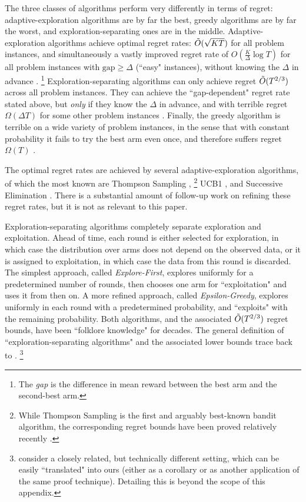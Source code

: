 The three classes of algorithms perform very differently in terms of regret: adaptive-exploration algorithms are by far the best, greedy algorithms are by far the worst, and exploration-separating ones are in the middle. Adaptive-exploration algorithms achieve optimal regret rates:
    $\tilde{O}(\sqrt{KT})$
for all problem instances, and simultaneously a vastly improved regret rate of
    $O(\tfrac{K}{\Delta}\log T)$
for all problem instances with $\text{gap}\geq \Delta$ (``easy" instances), without knowing the $\Delta$ in advance
\citep{Lai-Robbins-85,bandits-ucb1,bandits-exp3}.%
\footnote{The \emph{gap} is the difference in mean reward between the best arm and the second-best arm.}
Exploration-separating algorithms can only achieve regret $\tilde{O}(T^{2/3})$ across all problem instances. They can achieve the ``gap-dependent" regret rate stated above, but \emph{only} if they know the $\Delta$ in advance, and with terrible regret $\Omega(\Delta T)$ for some other problem instances \citep{MechMAB-ec09}. Finally, the greedy algorithm is terrible on a wide variety of problem instances, in the sense that with constant probability it fails to try the best arm even once, and therefore suffers regret $\Omega(T)$
\citep[see Chapter 11.2 in][]{slivkins-MABbook}.


The optimal regret rates are achieved by several adaptive-exploration  algorithms, of which the most known are
Thompson Sampling \citep{Thompson-1933,TS-survey-FTML18},%
\footnote{While Thompson Sampling is the first and arguably best-known bandit algorithm, the corresponding regret bounds have been proved relatively recently \citep{Shipra-colt12,Kaufmann-alt12,Shipra-aistats13}.}
UCB1 \citep{bandits-ucb1},
and Successive Elimination \citep{EvenDar-icml06}. There is a substantial amount of follow-up work on refining these regret rates, but it is not as relevant to this paper.

Exploration-separating algorithms completely separate exploration and exploitation. Ahead of time, each round is either selected for exploration, in which case  the distribution over arms does not depend on the observed data, or it is assigned to exploitation, in which case the data from this round is discarded. The simplest approach, called \emph{Explore-First}, explores uniformly for a predetermined number of rounds, then chooses one arm for ``exploitation" and uses it from then on. A more refined approach, called \emph{Epsilon-Greedy}, explores uniformly in each round with a predetermined probability, and ``exploits" with the remaining probability. Both algorithms, and the associated $\tilde{O}(T^{2/3})$ regret bounds, have been ``folklore knowledge" for decades. The general definition of ``exploration-separating algorithms" and the associated lower bounds trace back to \citet{MechMAB-ec09}.%
\footnote{\citet{MechMAB-ec09} consider a closely related, but technically different setting, which can be easily ``translated" into ours (either as a corollary or as another application of the same proof technique). Detailing this is beyond the scope of this appendix.}

